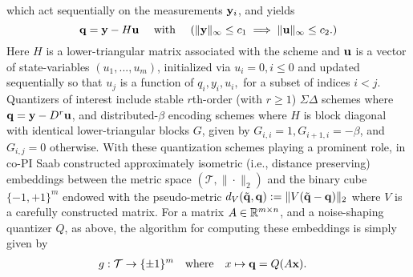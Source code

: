 \fi 
which act sequentially on the measurements $\mathbf{y}_i$, %
%
%
and yields
$$ \mathbf{q}=\mathbf{y} - H\mathbf{u} \quad \text{ with }  \quad(\|\mathbf{y}\|_\infty \leq c_1 \implies \|\mathbf{u}\|_\infty \leq c_2.) $$ Here $H$ is a lower-triangular matrix associated with the scheme and $\mathbf{u}$ is a vector of state-variables $(u_1,...,u_m)$, initialized via $u_i=0, i\leq 0$ and updated sequentially so that $u_j$ is a function of $q_i, y_i, u_i,$ for a subset of indices $i < j$. Quantizers of interest include
stable $r$th-order (with $r\geq 1$) $\Sigma\Delta$ schemes  \cite{daubechies2003approximating} where  $\mathbf{q}= \mathbf{y} - D^r \mathbf{u}$, and distributed-$\beta$ encoding schemes \cite{chou2016distributed} where $H$ is block diagonal with identical lower-triangular blocks $G$, given by $G_{i,i}=1, G_{i+1,i}=-\beta$, and $G_{i,j}=0$ otherwise.
With these quantization schemes playing a prominent role, in  \cite{huynh2018fast} co-PI Saab  constructed approximately isometric (i.e., distance preserving) embeddings between the metric space  $(\mathcal{T}, \|\cdot\|_2)$ and the binary  cube $\{-1,+1\}^m$ endowed with the pseudo-metric
$d_{{V}}(\tilde{\mathbf{q}},\mathbf{q}) := \| {V}(\tilde{\mathbf{q}} -{\mathbf{q}}) \|_2$
where $V$ is a carefully constructed matrix.
For a  matrix $A\in\mathbb{R}^{m\times n}$, and a noise-shaping quantizer $Q$, as above, the algorithm for computing these embeddings is simply given by \begin{align}
g: \mathcal{T} &\to \{\pm 1\}^m\nonumber\quad \text{where} \quad
x \mapsto \mathbf{q}=Q(A\mathbf{x}).\nonumber
\end{align}

